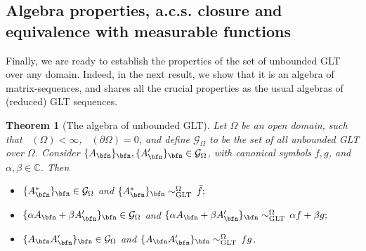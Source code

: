 \documentclass{amsart}
\newtheorem{thm}{Theorem}[section]
\DeclareMathOperator{\Ld}{\mathcal{L}^d}
\begin{document}
\subsection{Algebra properties, a.c.s. closure and equivalence with measurable functions}

Finally, we are ready to establish the properties of the set of unbounded GLT over any domain. Indeed, in the next result, we show that it is an algebra of matrix-sequences, and shares all the crucial properties as the usual algebras of (reduced) GLT sequences.

\begin{thm}[The algebra of unbounded GLT]\label{main_theorem}
Let $\Omega$ be an open domain, such that $\Ld(\Omega)<\infty$, $\Ld(\partial\Omega)=0$, and define $\mathcal{G}_{\Omega}$ to be the set of all unbounded GLT over $\Omega$. Consider $\{A_\bfn\}_\bfn,\{A'_\bfn\}_\bfn\in\mathcal{G}_{\Omega}$, with canonical symbols $f,g$, and $\alpha,\beta\in\mathbb{C}$. Then
\begin{itemize}
    \item[(i)]\label{main_item_i} $\{A_\bfn^*\}_\bfn\in\mathcal{G}_\Omega$ and $ \{A^*_{\bfn}\}_{\bfn}\sim_{\mathrm{GLT}}^{\Omega}\,\bar{f};$
    \item[(ii)]\label{main_item_ii} $\{\alpha A_\bfn+\beta A'_\bfn\}_\bfn\in\mathcal{G}_\Omega$ and $\{\alpha A_{\bfn}+\beta A'_\bfn\}_{\bfn}\sim_{\mathrm{GLT}}^{\Omega}\,\alpha f+\beta g;$
    \item[(iii)]\label{main_item_iii} $\{A_\bfn A'_\bfn\}_\bfn\in\mathcal{G}_\Omega$ and $\{A_{\bfn} A'_\bfn\}_{\bfn}\sim_{\mathrm{GLT}}^{\Omega}\,fg$.
\end{itemize}
\end{thm}
\end{document}
